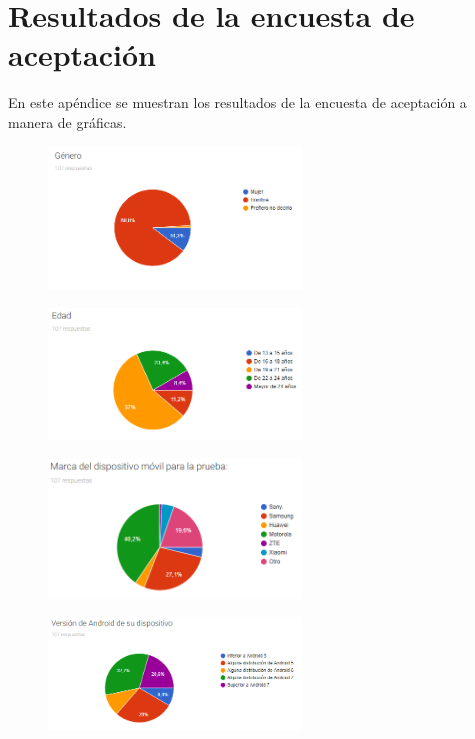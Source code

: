 \chapter{Resultados de la encuesta de aceptación} \label{Anexo:resultados}

En este apéndice se muestran los resultados de la encuesta de aceptación a 
manera de gráficas.

\begin{figure}[H]
    \centering
    \includegraphics[width=0.6\textwidth]{Anexos/respuestas/grafica01.png}
\end{figure}

\begin{figure}[H]
    \centering
    \includegraphics[width=0.6\textwidth]{Anexos/respuestas/grafica02.png}
\end{figure}

\begin{figure}[H]
    \centering
    \includegraphics[width=0.6\textwidth]{Anexos/respuestas/grafica03.png}
\end{figure}

\begin{figure}[H]
    \centering
    \includegraphics[width=0.6\textwidth]{Anexos/respuestas/grafica04.png}
\end{figure}

